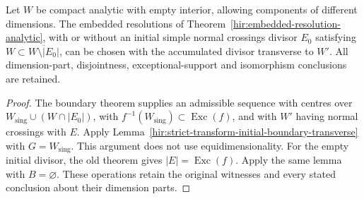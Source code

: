 \begin{theorem}
\label{hir:embedded-resolution-analytic-transverse}
\leanok
Let \(W\) be compact analytic with empty interior, allowing components of different dimensions. The embedded resolutions of Theorem~\ref{hir:embedded-resolution-analytic}, with or without an initial simple normal crossings divisor \(E_0\) satisfying \(W\subset\overline{W\setminus|E_0|}\), can be chosen with the accumulated divisor transverse to \(W'\). All dimension-part, disjointness, exceptional-support and isomorphism conclusions are retained.
\end{theorem}
\begin{proof}
The boundary theorem supplies an admissible sequence with centres over \(W_{\mathrm{sing}}\cup(W\cap|E_0|)\), with \(f^{-1}(W_{\mathrm{sing}})\subset\operatorname{Exc}(f)\), and with \(W'\) having normal crossings with \(E\). Apply Lemma~\ref{hir:strict-transform-initial-boundary-transverse} with \(G=W_{\mathrm{sing}}\). This argument does not use equidimensionality. For the empty initial divisor, the old theorem gives \(|E|=\operatorname{Exc}(f)\). Apply the same lemma with \(B=\varnothing\). These operations retain the original witnesses and every stated conclusion about their dimension parts.
\end{proof}

